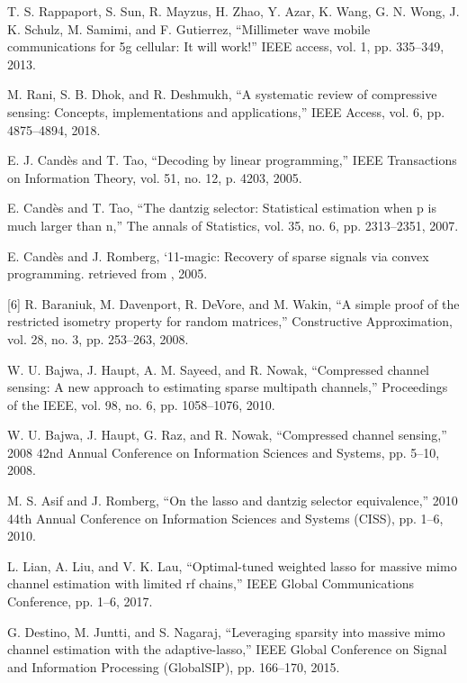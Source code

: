 \documentclass[journal]{IEEEtran}
\begin{document}
\begin{thebibliography}{30}
T. S. Rappaport, S. Sun, R. Mayzus, H. Zhao, Y. Azar, K. Wang, G. N. Wong, J. K. Schulz, M. Samimi, and F. Gutierrez, “Millimeter wave mobile communications for 5g cellular: It will work!” IEEE access, vol. 1, pp. 335–349, 2013.

M. Rani, S. B. Dhok, and R. Deshmukh, “A systematic review of compressive sensing: Concepts, implementations and applications,” IEEE Access, vol. 6, pp. 4875–4894, 2018.

E. J. Candès and T. Tao, “Decoding by linear programming,” IEEE Transactions on Information Theory, vol. 51, no. 12, p. 4203, 2005.

E. Candès and T. Tao, “The dantzig selector: Statistical estimation when p is much larger than n,” The annals of Statistics, vol. 35, no. 6, pp. 2313–2351, 2007.

E. Candès and J. Romberg, `11-magic: Recovery of sparse signals via convex programming. retrieved from , 2005.

[6] R. Baraniuk, M. Davenport, R. DeVore, and M. Wakin, “A simple proof of the restricted isometry property for random matrices,” Constructive Approximation, vol. 28, no. 3, pp. 253–263, 2008.

W. U. Bajwa, J. Haupt, A. M. Sayeed, and R. Nowak, “Compressed channel sensing: A new approach to estimating sparse multipath channels,” Proceedings of the IEEE, vol. 98, no. 6, pp. 1058–1076, 2010.

W. U. Bajwa, J. Haupt, G. Raz, and R. Nowak, “Compressed channel sensing,” 2008 42nd Annual Conference on Information Sciences and Systems, pp. 5–10, 2008.

M. S. Asif and J. Romberg, “On the lasso and dantzig selector equivalence,” 2010 44th Annual Conference on Information Sciences and Systems (CISS), pp. 1–6, 2010.

L. Lian, A. Liu, and V. K. Lau, “Optimal-tuned weighted lasso for massive mimo channel estimation with limited rf chains,” IEEE Global Communications Conference, pp. 1–6, 2017.

G. Destino, M. Juntti, and S. Nagaraj, “Leveraging sparsity into massive mimo channel estimation with the adaptive-lasso,” IEEE Global Conference on Signal and Information Processing (GlobalSIP), pp. 166–170, 2015.


\end{thebibliography}
\end{document}
